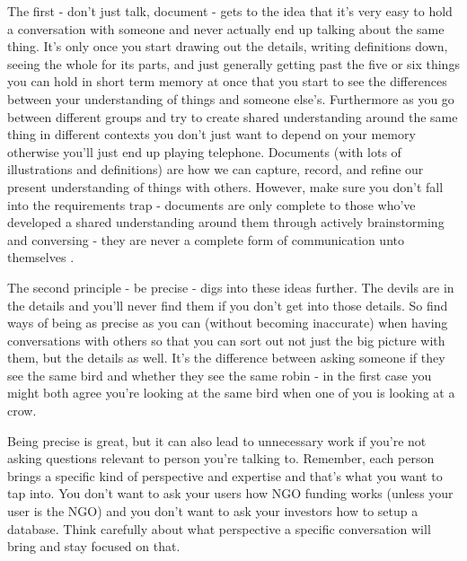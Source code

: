 \documentclass[11pt,a5paper]{book}
\begin{document}
The first - don't just talk, document - gets to the idea that it's very easy to hold a conversation with someone and never actually end up talking about the same thing. It's only once you start drawing out the details, writing definitions down, seeing the whole for its parts, and just generally getting past the five or six things you can hold in short term memory at once \cite{ericsson} that you start to see the differences between your understanding of things and someone else's. Furthermore as you go between different groups and try to create shared understanding around the same thing in different contexts you don't just want to depend on your memory otherwise you'll just end up playing telephone. Documents (with lots of illustrations and definitions) are how we can capture, record, and refine our present understanding of things with others. However, make sure you don't fall into the requirements trap - documents are only complete to those who've developed a shared understanding around them through actively brainstorming and conversing - they are never a complete form of communication unto themselves \cite{patton}.
\newline

The second principle - be precise - digs into these ideas further. The devils are in the details and you'll never find them if you don't get into those details. So find ways of being as precise as you can (without becoming inaccurate) when having conversations with others so that you can sort out not just the big picture with them, but the details as well. It's the difference between asking someone if they see the same bird and whether they see the same robin - in the first case you might both agree you're looking at the same bird when one of you is looking at a crow. 
\newline

Being precise is great, but it can also lead to unnecessary work if you're not asking questions relevant to person you're talking to. Remember, each person brings a specific kind of perspective and expertise and that's what you want to tap into. You don't want to ask your users how NGO funding works (unless your user is the NGO) and you don't want to ask your investors how to setup a database. Think carefully about what perspective a specific conversation will bring and stay focused on that.
\newline
\end{document}

